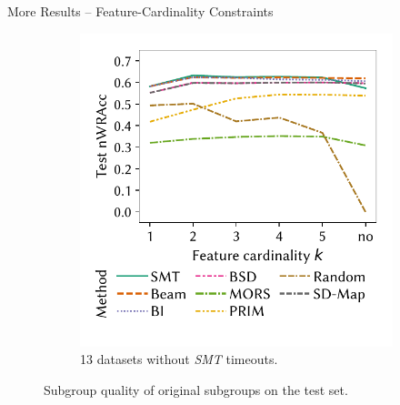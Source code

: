 \documentclass[en, navbaroff, handout]{sdqbeamer}
\begin{document}
\begin{frame}[t]{More Results -- Feature-Cardinality Constraints}
\begin{figure}
\begin{subfigure}[t]{0.35\textwidth}
		\end{subfigure}
		\hspace{\kitcolumnsep}
		\begin{subfigure}[t]{0.35\textwidth}
			\centering
			\includegraphics[width=\textwidth, trim=10 25 10 10, clip]{plots/csd-cardinality-test-nwracc-no-timeout-datasets.pdf}
			\caption{13 datasets without \emph{SMT} timeouts.}
			\label{fig:csd:cardinality-test-nwracc-no-timeout-datasets}
		\end{subfigure}
		\caption*{
			Subgroup quality of original subgroups on the test set.
		}
		\label{fig:csd:cardinality:appendix}
	\end{figure}
\end{frame}
\end{document}
